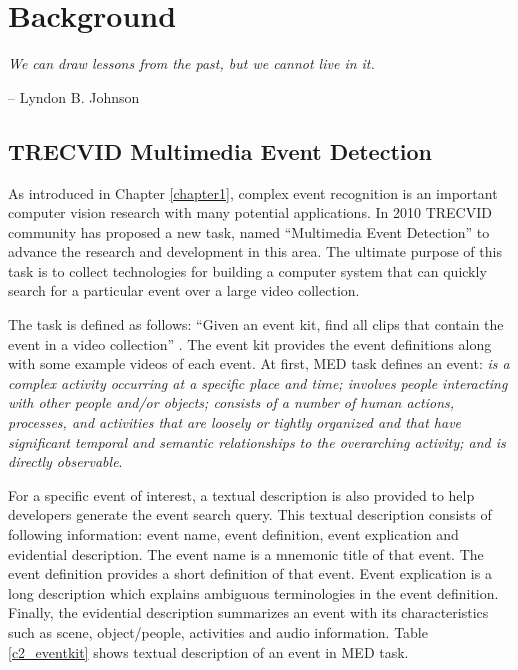 \chapter{Background}
\label{chapter2}
\epigraph{\textit{We can draw lessons from the past, but we cannot live in it.}}{ -- Lyndon B. Johnson}

\ifpdf
    \graphicspath{{Chapter2/Figs/Raster/}{Chapter2/Figs/PDF/}{Chapter2/Figs/}}
\else
    \graphicspath{{Chapter2/Figs/Vector/}{Chapter2/Figs/}}
\fi


\section{TRECVID Multimedia Event Detection}

As introduced in Chapter \ref{chapter1}, complex event recognition is an important computer vision research with many potential applications. In 2010 TRECVID community has proposed a new task, named ``Multimedia Event Detection'' to advance the research and development in this area. The ultimate purpose of this task is to collect technologies for building a computer system that can quickly search for a particular event over a large video collection.
 
The task is defined as follows: ``Given an event kit, find all clips that contain the event in a video collection'' \cite{over2011trecvid}. The event kit provides the event definitions along with some example videos of each event. At first, MED task defines an event:\textit{ is a complex activity occurring at a specific place and time; involves people interacting with other people and/or objects; consists of a number of human actions, processes, and activities that are loosely or tightly organized and that have significant temporal and semantic relationships to the overarching activity; and is directly observable}. 

For a specific event of interest, a textual description is also provided to help developers generate the event search query. This textual description consists of following information: event name, event definition, event explication and evidential description. The event name is a mnemonic title of that event. The event definition provides a short definition of that event. Event explication is a long description which explains ambiguous terminologies in the event definition. Finally, the evidential description summarizes an event with its characteristics such as scene, object/people, activities and audio information. Table \ref{c2_eventkit} shows textual description of an event in MED task.

